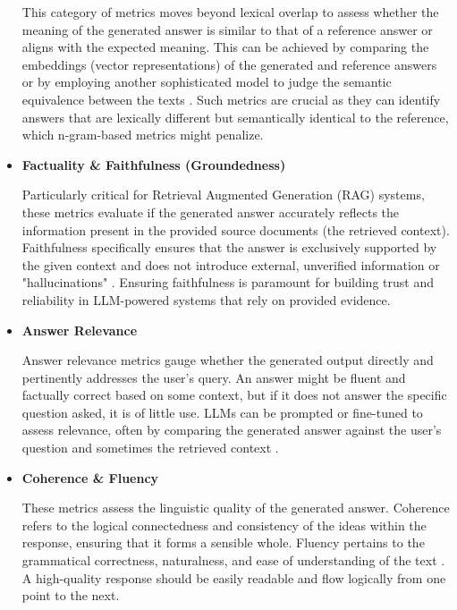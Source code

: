 \documentclass[12pt]{report}
\begin{document}
\begin{itemize}
  This category of metrics moves beyond lexical overlap to assess whether the meaning of the generated answer is similar to that of a reference answer or aligns with the expected meaning. This can be achieved by comparing the embeddings (vector representations) of the generated and reference answers or by employing another sophisticated model to judge the semantic equivalence between the texts \cite{Uppal2024SemanticSimilarity}. Such metrics are crucial as they can identify answers that are lexically different but semantically identical to the reference, which n-gram-based metrics might penalize.

  \item \textbf{Factuality \& Faithfulness (Groundedness)}

  Particularly critical for Retrieval Augmented Generation (RAG) systems, these metrics evaluate if the generated answer accurately reflects the information present in the provided source documents (the retrieved context). Faithfulness specifically ensures that the answer is exclusively supported by the given context and does not introduce external, unverified information or "hallucinations" \cite{Thulke2025FaithfulRAG}. Ensuring faithfulness is paramount for building trust and reliability in LLM-powered systems that rely on provided evidence.

  \item \textbf{Answer Relevance}

  Answer relevance metrics gauge whether the generated output directly and pertinently addresses the user's query. An answer might be fluent and factually correct based on some context, but if it does not answer the specific question asked, it is of little use. LLMs can be prompted or fine-tuned to assess relevance, often by comparing the generated answer against the user's question and sometimes the retrieved context \cite{Upadhyay2024RelevanceComparison, EvidentlyAI2025LLMasJudge}.

  \item \textbf{Coherence \& Fluency}

  These metrics assess the linguistic quality of the generated answer. Coherence refers to the logical connectedness and consistency of the ideas within the response, ensuring that it forms a sensible whole. Fluency pertains to the grammatical correctness, naturalness, and ease of understanding of the text \cite{Li2023LLMEval, Preprints2025LLMEvalReview}. A high-quality response should be easily readable and flow logically from one point to the next.


\end{itemize}
\end{document}
